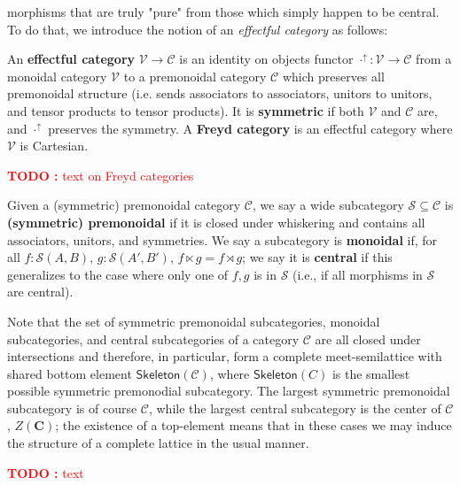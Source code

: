 \documentclass[acmsmall,screen,review]{acmart}
\newcounter{todos}
\newcommand{\TODO}[1]{{
  \stepcounter{todos}
  \begin{center}\large{\textcolor{red}{\textbf{TODO \arabic{todos}:} #1}}\end{center}
}}
\newcommand{\mc}[1]{\ensuremath{\mathcal{#1}}}
\newcommand{\mb}[1]{\ensuremath{\mathbf{#1}}}
\newcommand{\ms}[1]{\ensuremath{\mathsf{#1}}}
\newcommand{\upg}[2]{{#1}^{\uparrow #2}}
\begin{document}
morphisms that are truly "pure" from those which simply happen to be central. To
do that, we introduce the notion of an \textit{effectful category} as follows:
\begin{definition} 
  An \textbf{effectful category} \(\mc{V} \to \mc{C}\) is an identity on objects
  functor \(\upg{\cdot}{}: \mc{V} \to \mc{C}\) from a monoidal category
  \(\mc{V}\) to a premonoidal category \(\mc{C}\) which preserves all
  premonoidal structure (i.e. sends associators to associators, unitors to
  unitors, and tensor products to tensor products). It is \textbf{symmetric} if
  both \(\mc{V}\) and \(\mc{C}\) are, and \(\upg{\cdot}{}\) preserves the
  symmetry. A \textbf{Freyd category} is an effectful category where \(\mc{V}\)
  is Cartesian.
\end{definition}

\TODO{text on Freyd categories}

\begin{definition}
  Given a (symmetric) premonoidal category \(\mc{C}\), we say a wide subcategory
  \(\mc{S} \subseteq \mc{C}\) is \textbf{(symmetric) premonoidal} if it is
  closed under whiskering and contains all associators, unitors, and symmetries.
  We say a subcategory is \textbf{monoidal} if, for all \(f: \mc{S}(A, B)\),
  \(g: \mc{S}(A', B')\), \(f \ltimes g = f \rtimes g\); we say it is
  \textbf{central} if this generalizes to the case where only one of \(f, g\) is
  in \(\mc{S}\) (i.e., if all morphisms in \(\mc{S}\) are central).
\end{definition} 
Note that the set of symmetric premonoidal subcategories, monoidal
subcategories, and central subcategories of a category \(\mc{C}\) are all closed
under intersections and therefore, in particular, form a complete
meet-semilattice with shared bottom element \(\ms{Skeleton}(\mc{C})\), where
\(\ms{Skeleton}(C)\) is the smallest possible symmetric premonodial subcategory.
The largest symmetric premonoidal subcategory is of course \(\mc{C}\), while the
largest central subcategory is the center of \(\mc{C}\), \(Z(\mb{C})\); the
existence of a top-element means that in these cases we may induce the structure
of a complete lattice in the usual manner.


\TODO{text}
\end{document}
